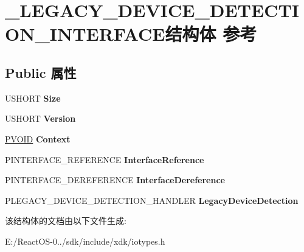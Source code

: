 \hypertarget{struct___l_e_g_a_c_y___d_e_v_i_c_e___d_e_t_e_c_t_i_o_n___i_n_t_e_r_f_a_c_e}{}\section{\+\_\+\+L\+E\+G\+A\+C\+Y\+\_\+\+D\+E\+V\+I\+C\+E\+\_\+\+D\+E\+T\+E\+C\+T\+I\+O\+N\+\_\+\+I\+N\+T\+E\+R\+F\+A\+C\+E结构体 参考}
\label{struct___l_e_g_a_c_y___d_e_v_i_c_e___d_e_t_e_c_t_i_o_n___i_n_t_e_r_f_a_c_e}
\subsection*{Public 属性}
\begin{DoxyCompactItemize}
\item 
\mbox{\label{struct___l_e_g_a_c_y___d_e_v_i_c_e___d_e_t_e_c_t_i_o_n___i_n_t_e_r_f_a_c_e_a6f8ee6c1ae7e4eafee8c300384e80a07}} 
U\+S\+H\+O\+RT {\bfseries Size}
\item 
\mbox{\label{struct___l_e_g_a_c_y___d_e_v_i_c_e___d_e_t_e_c_t_i_o_n___i_n_t_e_r_f_a_c_e_a42259884deac344a96d24d055ff440b8}} 
U\+S\+H\+O\+RT {\bfseries Version}
\item 
\mbox{\label{struct___l_e_g_a_c_y___d_e_v_i_c_e___d_e_t_e_c_t_i_o_n___i_n_t_e_r_f_a_c_e_ae67393e498f1836dc4e20ce599a7ef6b}} 
\hyperlink{interfacevoid}{P\+V\+O\+ID} {\bfseries Context}
\item 
\mbox{\label{struct___l_e_g_a_c_y___d_e_v_i_c_e___d_e_t_e_c_t_i_o_n___i_n_t_e_r_f_a_c_e_a87aa4a9d7f932bbe885ecedbb8837408}} 
P\+I\+N\+T\+E\+R\+F\+A\+C\+E\+\_\+\+R\+E\+F\+E\+R\+E\+N\+CE {\bfseries Interface\+Reference}
\item 
\mbox{\label{struct___l_e_g_a_c_y___d_e_v_i_c_e___d_e_t_e_c_t_i_o_n___i_n_t_e_r_f_a_c_e_a0cdf108b3e085a3ea11ff10457c42329}} 
P\+I\+N\+T\+E\+R\+F\+A\+C\+E\+\_\+\+D\+E\+R\+E\+F\+E\+R\+E\+N\+CE {\bfseries Interface\+Dereference}
\item 
\mbox{\label{struct___l_e_g_a_c_y___d_e_v_i_c_e___d_e_t_e_c_t_i_o_n___i_n_t_e_r_f_a_c_e_a431d8df9ba7e0de787d6189f690d0589}} 
P\+L\+E\+G\+A\+C\+Y\+\_\+\+D\+E\+V\+I\+C\+E\+\_\+\+D\+E\+T\+E\+C\+T\+I\+O\+N\+\_\+\+H\+A\+N\+D\+L\+ER {\bfseries Legacy\+Device\+Detection}
\end{DoxyCompactItemize}


该结构体的文档由以下文件生成\+:\begin{DoxyCompactItemize}
\item 
E\+:/\+React\+O\+S-\/0../sdk/include/xdk/iotypes.\+h\end{DoxyCompactItemize}
